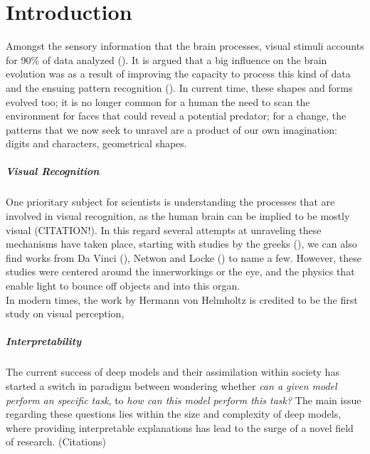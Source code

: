 \chapter*{Introduction}

Amongst the sensory information that the brain processes, visual stimuli accounts 
for 90\% of data analyzed (\cite{potter2014detecting}). It is argued that a big influence on the brain 
evolution was as a result of improving the capacity to process this kind of data and the ensuing 
pattern recognition (\cite{mattson2014superior}). 
In current time, these shapes and forms evolved too; it is no longer common for a human
the need to scan the environment for faces that could reveal a potential predator; for a change, 
the patterns that we now seek to unravel are a product of our own imagination: digits and characters, 
geometrical shapes.\\
\paragraph{Visual Recognition} One prioritary subject for scientists is understanding the processes 
that are involved in visual recognition, as the human brain can be implied to be mostly visual (CITATION!).
In this regard several attempts at unraveling these mechanisms have taken place, starting with studies by 
the greeks (\cite{finger2001origins}), we can also find works from Da Vinci (\cite{visualleonardo}), 
Netwon and Locke (\cite{swenson2010optics}) to name a few. However, these studies were centered 
around the innerworkings or the eye, and the physics that enable light to bounce off objects and 
into this organ.\\

In modern times, the work by Hermann von Helmholtz is credited to be the first study on visual perception,




\paragraph{Interpretability}

\noindent The current success of deep models and their assimilation within society has started a 
switch in paradigm between wondering whether \textit{can a given model perform an specific task}, 
to \textit{how can this model perform this task?} The main issue regarding these questions lies 
within the size and complexity of deep models, where providing interpretable explanations has lead
 to the surge of a novel field of research. (Citations)



